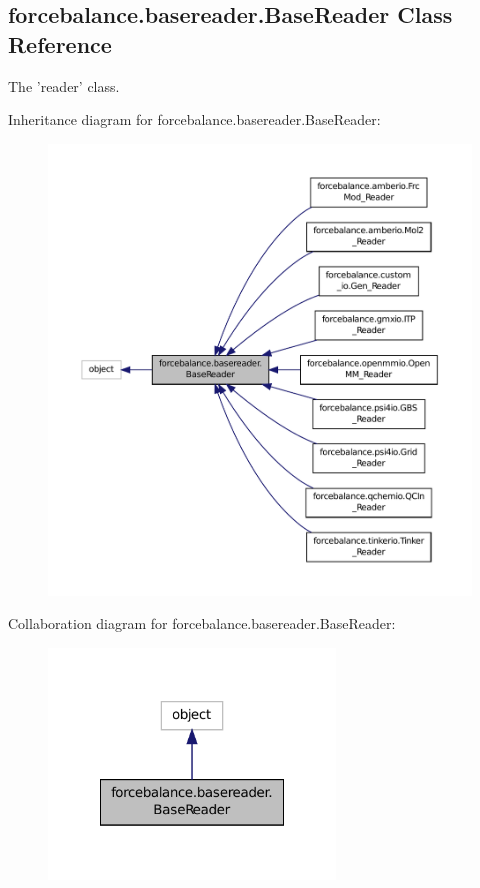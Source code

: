 \hypertarget{classforcebalance_1_1basereader_1_1BaseReader}{\subsection{forcebalance.\-basereader.\-Base\-Reader Class Reference}
\label{classforcebalance_1_1basereader_1_1BaseReader}
}


The 'reader' class.  




Inheritance diagram for forcebalance.\-basereader.\-Base\-Reader\-:
\nopagebreak
\begin{figure}[H]
\begin{center}
\leavevmode
\includegraphics[width=350pt]{classforcebalance_1_1basereader_1_1BaseReader__inherit__graph}
\end{center}
\end{figure}


Collaboration diagram for forcebalance.\-basereader.\-Base\-Reader\-:
\nopagebreak
\begin{figure}[H]
\begin{center}
\leavevmode
\includegraphics[width=216pt]{classforcebalance_1_1basereader_1_1BaseReader__coll__graph}
\end{center}
\end{figure}
